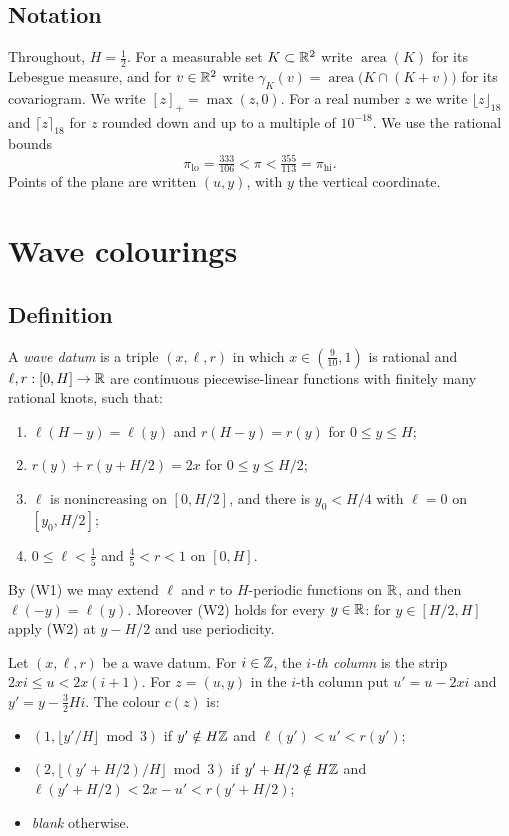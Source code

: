 \documentclass[11pt,colorlinks]{charlie}
\newcommand{\pos}[1]{\left[#1\right]_+}
\newcommand{\area}{\operatorname{area}}
\newcommand{\pilo}{\pi_{\mathrm{lo}}}
\newcommand{\pihi}{\pi_{\mathrm{hi}}}
\newcommand{\up}[1]{\lceil #1\rceil_{18}}
\newcommand{\dn}[1]{\lfloor #1\rfloor_{18}}
\begin{document}
\subsection*{Notation}
Throughout, $H=\tfrac12$. For a measurable set $K\subset\mathbb{R}^2$ write $\area(K)$ for its Lebesgue measure, and for $v\in\mathbb{R}^2$ write $\gamma_K(v)=\area\big(K\cap(K+v)\big)$ for its covariogram. We write $\pos{z}=\max(z,0)$. For a real number $z$ we write $\dn{z}$ and $\up{z}$ for $z$ rounded down and up to a multiple of $10^{-18}$. We use the rational bounds
\[
 \pilo=\tfrac{333}{106}<\pi<\tfrac{355}{113}=\pihi .
\]
Points of the plane are written $(u,y)$, with $y$ the vertical coordinate.

\section{Wave colourings}\label{sec:wave}

\subsection{Definition}
A \emph{wave datum} is a triple $(x,\ell,r)$ in which $x\in(\tfrac9{10},1)$ is rational and $\ell,r:[0,H]\to\mathbb{R}$ are continuous piecewise-linear functions with finitely many rational knots, such that:
\begin{enumerate}
\item[(W1)] $\ell(H-y)=\ell(y)$ and $r(H-y)=r(y)$ for $0\le y\le H$;
\item[(W2)] $r(y)+r(y+H/2)=2x$ for $0\le y\le H/2$;
\item[(W3)] $\ell$ is nonincreasing on $[0,H/2]$, and there is $y_0<H/4$ with $\ell=0$ on $[y_0,H/2]$;
\item[(W4)] $0\le\ell<\tfrac15$ and $\tfrac45<r<1$ on $[0,H]$.
\end{enumerate}
By (W1) we may extend $\ell$ and $r$ to $H$-periodic functions on $\mathbb{R}$, and then $\ell(-y)=\ell(y)$. Moreover (W2) holds for every $y\in\mathbb{R}$: for $y\in[H/2,H]$ apply (W2) at $y-H/2$ and use periodicity.

\begin{definition}\label{def:wave}
Let $(x,\ell,r)$ be a wave datum. For $i\in\mathbb{Z}$, the \emph{$i$-th column} is the strip $2xi\le u<2x(i+1)$. For $z=(u,y)$ in the $i$-th column put $u'=u-2xi$ and $y'=y-\tfrac32Hi$. The colour $c(z)$ is:
\begin{itemize}
\item $(1,\lfloor y'/H\rfloor\bmod3)$ if $y'\notin H\mathbb{Z}$ and $\ell(y')<u'<r(y')$;
\item $(2,\lfloor (y'+H/2)/H\rfloor\bmod3)$ if $y'+H/2\notin H\mathbb{Z}$ and $\ell(y'+H/2)<2x-u'<r(y'+H/2)$;
\item \emph{blank} otherwise.
\end{itemize}
\end{definition}
\end{document}
